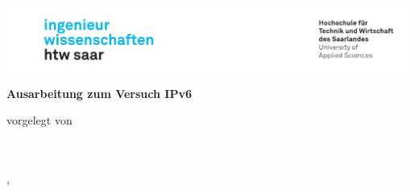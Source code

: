 \begin{titlepage}\linespread{1.5}\selectfont
\includegraphics[width=\linewidth]{Graphics/htwsaar_Logo_inwi_head_VF_4C_crop}
  \begin{center}
    \large  
    \hfill
    \vfill
    \begingroup
      \Large\bfseries\huge Ausarbeitung zum Versuch
    \endgroup
	\hfill
    \vfill
    \begingroup
      \Large\bfseries\huge IPv6
    \endgroup
% 		
%     
   \vfill
% 
% 
	
  vorgelegt von \\
  \vspace{\baselineskip}
  \NameL\\
  \NameY\\
	
  \vfill
	
% 	
  \vfill
	
  \myLocation, \myTime                   

    \end{center}       
\end{titlepage}   